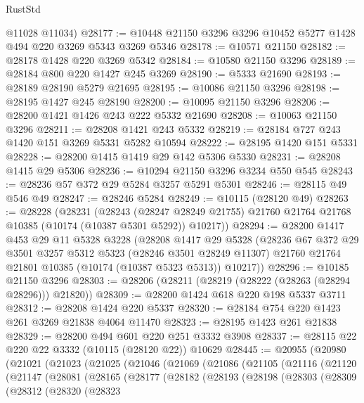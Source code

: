 \begin{lexlean}{RustStd}
\begin{coremodule}
      @11028
      @11034)
@28177 := @10448 @21150 @3296 @3296 @10452 @5277 @1428 @494 @220 @3269 @5343 @3269 @5346
@28178 := @10571 @21150
@28182 := @28178 @1428 @220 @3269 @5342
@28184 := @10580 @21150 @3296
@28189 := @28184 @800 @220 @1427 @245 @3269
@28190 := @5333 @21690
@28193 := @28189 @28190 @5279 @21695
@28195 := @10086 @21150 @3296
@28198 := @28195 @1427 @245 @28190
@28200 := @10095 @21150 @3296
@28206 := @28200 @1421 @1426 @243 @222 @5332 @21690
@28208 := @10063 @21150 @3296
@28211 := @28208 @1421 @243 @5332
@28219 := @28184 @727 @243 @1420 @151 @3269 @5331 @5282 @10594
@28222 := @28195 @1420 @151 @5331
@28228 := @28200 @1415 @1419 @29 @142 @5306 @5330
@28231 := @28208 @1415 @29 @5306
@28236 := @10294 @21150 @3296 @3234 @550 @545
@28243 := @28236 @57 @372 @29 @5284 @3257 @5291 @5301
@28246 := @28115 @49 @546 @49
@28247 := @28246 @5284
@28249 := @10115 (@28120 @49)
@28263 := @28228
    (@28231
      (@28243
        (@28247 @28249 @21755)
        @21760
        @21764
        @21768
        @10385
        (@10174 (@10387 @5301 @5292))
        @10217))
@28294 := @28200
    @1417
    @453
    @29
    @11
    @5328
    @3228
    (@28208
      @1417
      @29
      @5328
      (@28236
        @67
        @372
        @29
        @3501
        @3257
        @5312
        @5323
        (@28246 @3501 @28249 @11307)
        @21760
        @21764
        @21801
        @10385
        (@10174 (@10387 @5323 @5313))
        @10217))
@28296 := @10185 @21150 @3296
@28303 := @28206 (@28211 (@28219 (@28222 (@28263 (@28294 @28296))) @21820))
@28309 := @28200 @1424 @618 @220 @198 @5337 @3711
@28312 := @28208 @1424 @220 @5337
@28320 := @28184 @754 @220 @1423 @261 @3269 @21838 @4064 @11470
@28323 := @28195 @1423 @261 @21838
@28329 := @28200 @494 @601 @220 @251 @3332 @3908
@28337 := @28115 @22 @220 @22 @3332 (@10115 (@28120 @22)) @10629
@28445 := @20955
    (@20980
      (@21021
        (@21023
          (@21025
            (@21046
              (@21069
                (@21086
                  (@21105
                    (@21116
                      (@21120
                        (@21147
                          (@28081
                            (@28165
                              (@28177
                                (@28182
                                  (@28193
                                    (@28198
                                      (@28303
                                        (@28309
                                          (@28312
                                            (@28320
                                              (@28323

\end{coremodule}
\end{lexlean}
